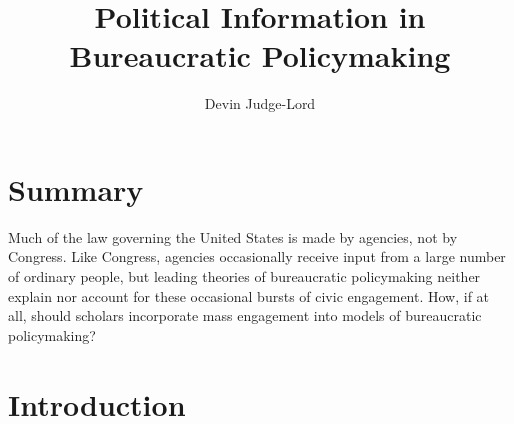 \documentclass{article}
\title{Political Information in Bureaucratic Policymaking}
\author{Devin Judge-Lord} %
\begin{document}
\maketitle
\abstract{}















\newpage
\tableofcontents

\newpage
\section*{Summary}

Much of the law governing the United States is made by agencies, not by Congress. Like Congress, agencies occasionally receive input from a large number of ordinary people, but leading theories of bureaucratic policymaking neither explain nor account for these occasional bursts of civic engagement.
How, if at all, should scholars incorporate mass engagement into models of bureaucratic policymaking? %


\doublespace
% 

\newpage
\section{Introduction} \label{intro}


\end{document}
